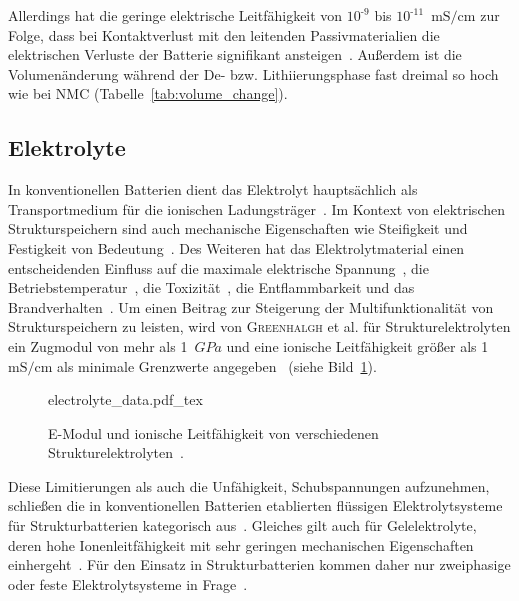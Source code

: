 Allerdings hat die geringe elektrische Leitfähigkeit von $10^{\text{-}9}$ bis $10^{\text{-}11}$~$\si{\milli \siemens \per \cm}$ zur Folge, dass bei Kontaktverlust mit den leitenden Passivmaterialien die elektrischen Verluste der Batterie signifikant ansteigen~\cite{Padhi1997}. Außerdem ist die Volumenänderung während der De- bzw. Lithiierungsphase fast dreimal so hoch wie bei NMC (Tabelle~\ref{tab:volume_change}).

\subsection{Elektrolyte}
In konventionellen Batterien dient das Elektrolyt hauptsächlich als Transportmedium für die ionischen Ladungsträger~\cite{Gerlach2020}. Im Kontext von elektrischen Strukturspeichern sind auch mechanische Eigenschaften wie Steifigkeit und Festigkeit von Bedeutung~\cite{Greenhalgh2023}. Des Weiteren hat das Elektrolytmaterial einen entscheidenden Einfluss auf die maximale elektrische Spannung~\cite{Xu2016}, die Betriebstemperatur~\cite{Chen2022a}, die Toxizität~\cite{Beard2019}, die Entflammbarkeit und das Brandverhalten~\cite{Roth2012}. Um einen Beitrag zur Steigerung der Multifunktionalität von Strukturspeichern zu leisten, wird von \textsc{Greenhalgh} et al. für Strukturelektrolyten ein Zugmodul von mehr als 1~$\si{GPa}$ und eine ionische Leitfähigkeit größer als 1~$\si{\milli \siemens \per \cm}$ als minimale Grenzwerte angegeben~\cite{Greenhalgh2023} (siehe Bild~\ref{fig:electrolyte_data}).
\begin{figure}[ht]
        \center
		{electrolyte_data.pdf_tex}
		\caption{\label{fig:electrolyte_data}E-Modul und ionische Leitfähigkeit von verschiedenen Strukturelektrolyten~\cite{Greenhalgh2023}.}
\end{figure}

Diese Limitierungen als auch die Unfähigkeit, Schubspannungen aufzunehmen, schließen die in konventionellen Batterien etablierten flüssigen Elektrolytsysteme für Strukturbatterien kategorisch aus~\cite{Shirshova2013, Greenhalgh2023}. Gleiches gilt auch für Gelelektrolyte, deren hohe Ionenleitfähigkeit mit sehr geringen mechanischen Eigenschaften einhergeht~\cite{Gayet2009, Li2018, Zhao2020a}. Für den Einsatz in Strukturbatterien kommen daher nur zweiphasige oder feste Elektrolytsysteme in Frage~\cite{Greenhalgh2023}.


